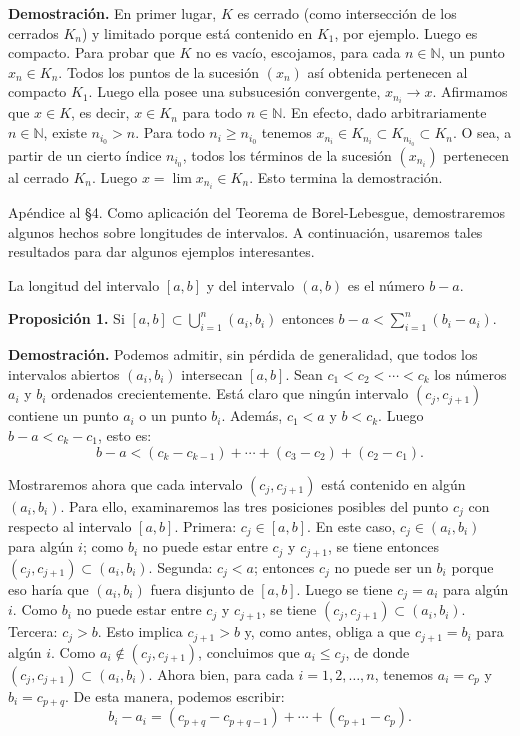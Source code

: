 \documentclass[12pt,oneside]{book}
\begin{document}
\textbf{Demostración.} En primer lugar, \(K\) es cerrado (como intersección de los cerrados \(K_n\)) y limitado porque está contenido en \(K_1\), por ejemplo. Luego es compacto. Para probar que \(K\) no es vacío, escojamos, para cada \(n \in \mathbb{N}\), un punto \(x_n \in K_n\). Todos los puntos de la sucesión \((x_n)\) así obtenida pertenecen al compacto \(K_1\). Luego ella posee una subsucesión convergente, \(x_{n_i} \to x\). Afirmamos que \(x \in K\), es decir, \(x \in K_n\) para todo \(n \in \mathbb{N}\). En efecto, dado arbitrariamente \(n \in \mathbb{N}\), existe \(n_{i_0} > n\). Para todo \(n_i \ge n_{i_0}\) tenemos \(x_{n_i} \in K_{n_i} \subset K_{n_{i_0}} \subset K_n\). O sea, a partir de un cierto índice \(n_{i_0}\), todos los términos de la sucesión \((x_{n_i})\) pertenecen al cerrado \(K_n\). Luego \(x = \lim x_{n_i} \in K_n\). Esto termina la demostración.

Apéndice al §4. Como aplicación del Teorema de Borel-Lebesgue, demostraremos algunos hechos sobre longitudes de intervalos. A continuación, usaremos tales resultados para dar algunos ejemplos interesantes.

La longitud del intervalo \([a, b]\) y del intervalo \((a, b)\) es el número \(b - a\).

\textbf{Proposición 1.} Si \([a, b] \subset \bigcup_{i=1}^n (a_i, b_i)\) entonces \(b - a < \sum_{i=1}^n (b_i - a_i)\).

\textbf{Demostración.} Podemos admitir, sin pérdida de generalidad, que todos los intervalos abiertos \((a_i, b_i)\) intersecan \([a, b]\). Sean \(c_1 < c_2 < \cdots < c_k\) los números \(a_i\) y \(b_i\) ordenados crecientemente. Está claro que ningún intervalo \((c_j, c_{j+1})\) contiene un punto \(a_i\) o un punto \(b_i\). Además, \(c_1 < a\) y \(b < c_k\). Luego \(b - a < c_k - c_1\), esto es:
\[
b - a < (c_k - c_{k-1}) + \cdots + (c_3 - c_2) + (c_2 - c_1).
\]

Mostraremos ahora que cada intervalo \((c_j, c_{j+1})\) está contenido en algún \((a_i, b_i)\). Para ello, examinaremos las tres posiciones posibles del punto \(c_j\) con respecto al intervalo \([a, b]\). Primera: \(c_j \in [a, b]\). En este caso, \(c_j \in (a_i, b_i)\) para algún \(i\); como \(b_i\) no puede estar entre \(c_j\) y \(c_{j+1}\), se tiene entonces \((c_j, c_{j+1}) \subset (a_i, b_i)\). Segunda: \(c_j < a\); entonces \(c_j\) no puede ser un \(b_i\) porque eso haría que \((a_i, b_i)\) fuera disjunto de \([a, b]\). Luego se tiene \(c_j = a_i\) para algún \(i\). Como \(b_i\) no puede estar entre \(c_j\) y \(c_{j+1}\), se tiene \((c_j, c_{j+1}) \subset (a_i, b_i)\). Tercera: \(c_j > b\). Esto implica \(c_{j+1} > b\) y, como antes, obliga a que \(c_{j+1} = b_i\) para algún \(i\). Como \(a_i \notin (c_j, c_{j+1})\), concluimos que \(a_i \leq c_j\), de donde \((c_j, c_{j+1}) \subset (a_i, b_i)\). Ahora bien, para cada \(i = 1, 2, \ldots, n\), tenemos \(a_i = c_p\) y \(b_i = c_{p+q}\). De esta manera, podemos escribir:
\[
b_i - a_i = (c_{p+q} - c_{p+q-1}) + \cdots + (c_{p+1} - c_p).
\]
\end{document}
